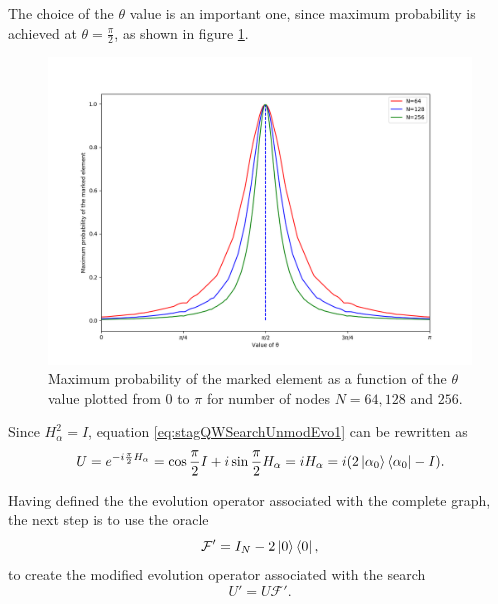               The choice of the $\theta$ value is an important one, since maximum probability is achieved at $\theta = \frac{\pi}{2}$, as shown in figure \ref{fig:stagMultTheta}.
            \begin{figure}[!h]
                    \centering
                  \includegraphics[scale=0.40]{img/StagQW/search/multipleThetaProb.png}
                     \caption{Maximum probability of the marked element as a function of the $\theta$ value plotted from $0$ to $\pi$ for number of nodes $N=64,128$ and $256$.} 
                     \label{fig:stagMultTheta}
              \end{figure}
              Since $H_\alpha^2 = I$, equation \ref{eq:stagQWSearchUnmodEvo1} can be rewritten as
              \begin{equation}
                  U = e^{-i\frac{\pi}{2} H_\alpha} = \cos{\frac{\pi}{2}I} + i\sin{\frac{\pi}{2}H_\alpha} = i H_\alpha = i(2\ket{\alpha_0}\bra{\alpha_0} - I).
              \end{equation}\par
               Having defined the the evolution operator associated with the complete graph, the next step is to use the oracle
                \begin{equation}
                    \mathcal{F'} = I_N - 2\ket{0}\bra{0},
                \end{equation}
                to create the modified evolution operator associated with the search
                \begin{equation}
                    U' = U\mathcal{F'}.
                \end{equation}\par
